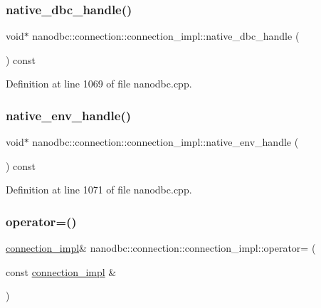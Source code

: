 \subsubsection{\texorpdfstring{native\_dbc\_handle()}{native\_dbc\_handle()}}
{\footnotesize\ttfamily void$\ast$ nanodbc\+::connection\+::connection\+\_\+impl\+::native\+\_\+dbc\+\_\+handle (\begin{DoxyParamCaption}{ }\end{DoxyParamCaption}) const\hspace{0.3cm}{\ttfamily [inline]}}



Definition at line 1069 of file nanodbc.\+cpp.

\mbox{\label{classnanodbc_1_1connection_1_1connection__impl_a46755c1b7518a0abc96d023e2b5a0811}} 
\subsubsection{\texorpdfstring{native\_env\_handle()}{native\_env\_handle()}}
{\footnotesize\ttfamily void$\ast$ nanodbc\+::connection\+::connection\+\_\+impl\+::native\+\_\+env\+\_\+handle (\begin{DoxyParamCaption}{ }\end{DoxyParamCaption}) const\hspace{0.3cm}{\ttfamily [inline]}}



Definition at line 1071 of file nanodbc.\+cpp.

\mbox{\label{classnanodbc_1_1connection_1_1connection__impl_a4b97ea94ea4ce47192f822b779a0d127}} 
\subsubsection{\texorpdfstring{operator=()}{operator=()}}
{\footnotesize\ttfamily \mbox{\hyperlink{classnanodbc_1_1connection_1_1connection__impl}{connection\+\_\+impl}}\& nanodbc\+::connection\+::connection\+\_\+impl\+::operator= (\begin{DoxyParamCaption}\item[{const \mbox{\hyperlink{classnanodbc_1_1connection_1_1connection__impl}{connection\+\_\+impl}} \&}]{ }\end{DoxyParamCaption})\hspace{0.3cm}{\ttfamily [delete]}}


